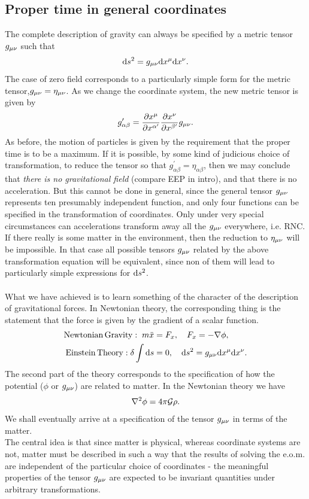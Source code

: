 \subsection{Proper time in general coordinates}
The complete description of gravity can always be specified by a metric tensor $g_{\mu \nu}$ such that
\begin{equation}
\mathrm{d} s^2 = g_{\mu \nu} \mathrm{d} x^\mu \mathrm{d} x^\nu.
\end{equation}
The case of zero field corresponds to a particularly simple form for the metric tensor,$g_{\mu \nu} = \eta_{\mu \nu}$. As we change the coordinate system, the new metric tensor is given by
\begin{equation}
g^\prime_{\alpha \beta} = \frac{\partial x^\mu}{\partial x^{\alpha^\prime}} \frac{\partial x^\nu}{\partial x^{\beta^\prime}} g_{\mu \nu}.
\end{equation}
As before, the motion of particles is given by the requirement that the proper time is to be a maximum. If it is possible, by some kind of judicious choice of transformation, to reduce the tensor so that $g^\prime_{\alpha \beta} = \eta_{\alpha \beta}$, then we may conclude that \emph{there is no gravitational field} (compare EEP in intro), and that there is no acceleration. But this cannot be done in general, since the general tensor $g_{\mu \nu}$ represents ten presumably independent function, and only four functions can be specified in the transformation of coordinates. Only under very special circumstances can accelerations transform away all the $g_{\mu \nu}$ everywhere, i.e. RNC. If there really is some matter in the environment, then the reduction to $\eta_{\mu \nu}$ will be impossible. In that case all possible tensors $g_{\mu \nu}$ related by the above transformation equation will be equivalent, since non of them will lead to particularly simple expressions for $\mathrm{d} s^2$.
\\
\\
What we have achieved is to learn something of the character of the description of gravitational forces. In Newtonian theory, the corresponding thing is the statement that the force is given by the gradient of a scalar function.
\begin{align}
	\mathrm{Newtonian\, Gravity}: \; m\ddot{x} &= F_x, \quad F_x = - \nabla \phi,\\
	\mathrm{Einstein \, Theory}: \delta \int \mathrm{d} s &= 0, \quad \mathrm{d} s^2 = g_{\mu \nu} \mathrm{d} x^\mu \mathrm{d} x^\nu.
\end{align}
The second part of the theory corresponds to the specification of how the potential ($\phi$ or $g_{\mu \nu}$)   are related to matter. In the Newtonian theory we have
\begin{equation}
\laplacian{\phi} = 4\pi \mG \rho.
\end{equation}
We shall eventually arrive at a specification of the tensor $g_{\mu \nu}$ in terms of the matter. \\
The central idea is that since matter is physical, whereas coordinate systems are not, matter must be described in such a way that the results of solving the e.o.m. are independent of the particular choice of coordinates - the meaningful properties of the tensor $g_{\mu \nu}$ are expected to be invariant quantities under arbitrary transformations.

